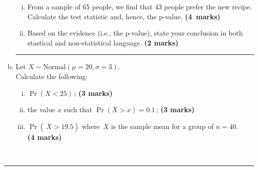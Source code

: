 \documentclass[12pt]{article}
\begin{document}
\begin{enumerate}[a)]
\begin{enumerate}[i)]
    \item From a sample of 65 people, we find that 43 people prefer the new recipe. Calculate the test statistic and, hence, the p-value. \hfill{\mbox{\scriptsize \bf (4 marks)}}
    \item Based on the evidence (i.e., the p-value), state your conclusion in both stastical and non-statistical language. \hfill{\scriptsize \bf (2 marks)}
    \end{enumerate}
    \begin{center}\noindent\rule{0.4\linewidth}{0.5pt}\end{center}
\item Let $X \sim \text{Normal}(\mu = 20, \sigma = 3)$.\\[0.3cm]
    Calculate the following:
    \begin{enumerate}[i)]\itemsep0.3cm
    \item $\Pr(X < 25)$\,; \hfill{\scriptsize \bf (3 marks)}
    \item the value $x$ such that $\Pr(X > x) = 0.1$\,; \hfill{\scriptsize \bf (3 marks)}
    \item $\Pr(\,\overline{\!X} > 19.5)$ where $\,\overline{\!X}$ is the sample mean for a group of $n=40$.\\
        \phantom{a}\hfill{\scriptsize \bf (4 marks)}
    \end{enumerate}
\end{enumerate}
\quad\\[-0.3cm]
\noindent\rule{\linewidth}{1pt}

\newpage
\end{document}
